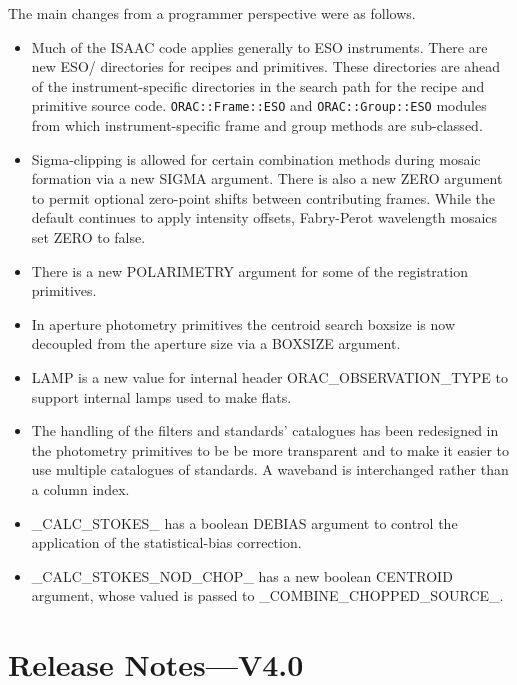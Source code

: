 \documentclass[twoside,11pt,nolof]{starlink}
\begin{document}
The main changes from a programmer perspective were as follows.

\begin{itemize}
   \item Much of the ISAAC code applies generally to ESO instruments.
   There are new ESO/ directories for recipes and primitives.  These
   directories are ahead of the instrument-specific directories in the
   search path for the recipe and primitive source code. \texttt{ORAC::Frame::ESO} and \texttt{ORAC::Group::ESO} modules from which
   instrument-specific frame and group methods are sub-classed.

   \item  Sigma-clipping is allowed for certain combination methods
   during mosaic formation via a new SIGMA argument.  There is also
   a new ZERO argument to permit optional zero-point shifts between
   contributing frames.  While the default continues to apply intensity
   offsets, Fabry-Perot wavelength mosaics set ZERO to false.

   \item There is a new POLARIMETRY argument for some of the
   registration primitives.

   \item In aperture photometry primitives the centroid search
   boxsize is now decoupled from the aperture size via a BOXSIZE
   argument.

   \item LAMP is a new value for internal header
   ORAC\_OBSERVATION\_TYPE to support internal lamps used to make
   flats.

   \item The handling of the filters and standards' catalogues has
   been redesigned in the photometry primitives to be be more
   transparent and to make it easier to use multiple catalogues of
   standards.  A waveband is interchanged rather than a column index.

   \item \_CALC\_STOKES\_ has a boolean DEBIAS argument to control the
   application of the statistical-bias correction.

   \item \_CALC\_STOKES\_NOD\_CHOP\_ has a new boolean CENTROID
   argument, whose valued is passed to \_COMBINE\_CHOPPED\_SOURCE\_.

\end{itemize}

\newpage
\section{Release Notes---V4.0\label{se_changes4p0}}
\end{document}
